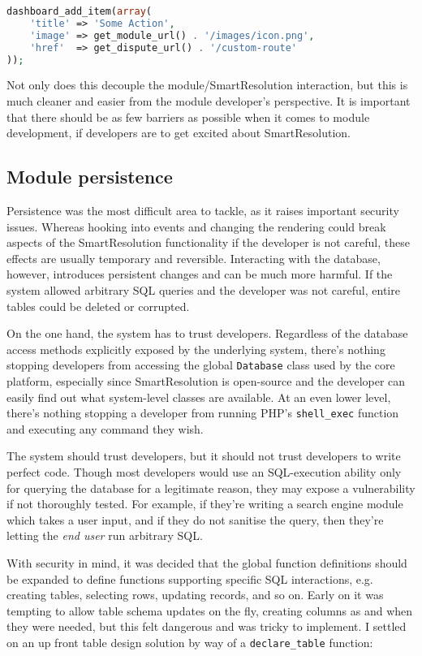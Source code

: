 \begin{lstlisting}[language=php]
dashboard_add_item(array(
    'title' => 'Some Action',
    'image' => get_module_url() . '/images/icon.png',
    'href'  => get_dispute_url() . '/custom-route'
));
\end{lstlisting}

Not only does this decouple the module/SmartResolution interaction, but this is much cleaner and easier from the module developer's perspective. It is important that there should be as few barriers as possible when it comes to module development, if developers are to get excited about SmartResolution.

\subsection{Module persistence}

Persistence was the most difficult area to tackle, as it raises important security issues. Whereas hooking into events and changing the rendering could break aspects of the SmartResolution functionality if the developer is not careful, these effects are usually temporary and reversible. Interacting with the database, however, introduces persistent changes and can be much more harmful. If the system allowed arbitrary SQL queries and the developer was not careful, entire tables could be deleted or corrupted.

On the one hand, the system has to trust developers. Regardless of the database access methods explicitly exposed by the underlying system, there's nothing stopping developers from accessing the global \lstinline{Database} class used by the core platform, especially since SmartResolution is open-source and the developer can easily find out what system-level classes are available. At an even lower level, there's nothing stopping a developer from running PHP's \lstinline{shell_exec} function and executing any command they wish.

The system should trust developers, but it should not trust developers to write perfect code. Though most developers would use an SQL-execution ability only for querying the database for a legitimate reason, they may expose a vulnerability if not thoroughly tested. For example, if they're writing a search engine module which takes a user input, and if they do not sanitise the query, then they're letting the \emph{end user} run arbitrary SQL.

With security in mind, it was decided that the global function definitions should be expanded to define functions supporting specific SQL interactions, e.g. creating tables, selecting rows, updating records, and so on. Early on it was tempting to allow table schema updates on the fly, creating columns as and when they were needed, but this felt dangerous and was tricky to implement. I settled on an up front table design solution by way of a \lstinline{declare_table} function:

